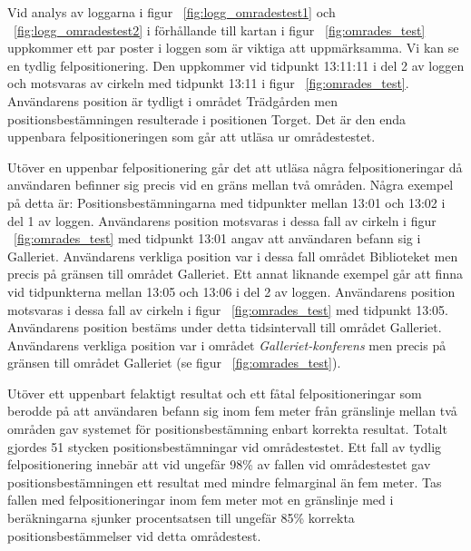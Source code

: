 \documentclass[a4paper,12pt]{article}
\begin{document}
 Vid analys av loggarna i figur ~\ref{fig:logg_omradestest1} och ~\ref{fig:logg_omradestest2} i förhållande till kartan i figur ~\ref{fig:omrades_test} uppkommer ett par poster i loggen som är viktiga att uppmärksamma.
 Vi kan se en tydlig felpositionering. Den uppkommer vid tidpunkt 13:11:11 i del 2 av loggen och motsvaras av cirkeln med tidpunkt 13:11 i figur ~\ref{fig:omrades_test}. Användarens position är tydligt i området Trädgården men positionsbestämningen resulterade i positionen Torget. Det är den enda uppenbara felpositioneringen som går att utläsa ur områdestestet.

 Utöver en uppenbar felpositionering går det att utläsa några felpositioneringar då användaren befinner sig precis vid en gräns mellan två områden. Några exempel på detta är:
 Positionsbestämningarna med tidpunkter mellan 13:01 och 13:02 i del 1 av loggen. Användarens position motsvaras i dessa fall av cirkeln i figur ~\ref{fig:omrades_test} med tidpunkt 13:01 angav att användaren befann sig i Galleriet. Användarens verkliga position var i dessa fall området Biblioteket men precis på gränsen till området Galleriet.
 Ett annat liknande exempel går att finna vid tidpunkterna mellan 13:05 och 13:06 i del 2 av loggen. Användarens position motsvaras i dessa fall av cirkeln i figur ~\ref{fig:omrades_test} med tidpunkt 13:05. Användarens position bestäms under detta tidsintervall till området Galleriet. Användarens verkliga position var i området \textit{Galleriet-konferens} men precis på gränsen till området Galleriet (se figur ~\ref{fig:omrades_test}).

 Utöver ett uppenbart felaktigt resultat och ett fåtal felpositioneringar som berodde på att användaren befann sig inom fem meter från gränslinje mellan två områden gav systemet för positionsbestämning enbart korrekta resultat. Totalt gjordes 51 stycken positionsbestämningar vid områdestestet. Ett fall av tydlig felpositionering innebär att vid ungefär 98\% av fallen vid områdestestet gav positionsbestämningen ett resultat med mindre felmarginal än fem meter. Tas fallen med felpositioneringar inom fem meter mot en gränslinje med i beräkningarna sjunker procentsatsen till ungefär 85\% korrekta positionsbestämmelser vid detta områdestest.
\end{document}
